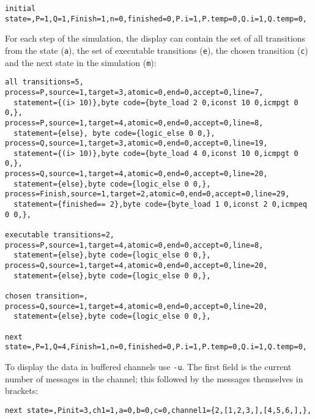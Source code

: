 \documentclass[11pt]{article}
\newcommand*{\p}[1]{\texttt{#1}}
\begin{document}
\begin{footnotesize}
\begin{verbatim}
initial state=,P=1,Q=1,Finish=1,n=0,finished=0,P.i=1,P.temp=0,Q.i=1,Q.temp=0,
\end{verbatim}
\end{footnotesize}

For each step of the simulation, the display can contain the set of all
transitions from the state (\p{a}), the set of executable transitions
(\p{e}), the chosen transition (\p{c}) and the next state in the
simulation (\p{m}):

\begin{footnotesize}
\begin{verbatim}
all transitions=5,
process=P,source=1,target=3,atomic=0,end=0,accept=0,line=7,
  statement={(i> 10)},byte code={byte_load 2 0,iconst 10 0,icmpgt 0 0,},
process=P,source=1,target=4,atomic=0,end=0,accept=0,line=8,
  statement={else}, byte code={logic_else 0 0,},
process=Q,source=1,target=3,atomic=0,end=0,accept=0,line=19,
  statement={(i> 10)},byte code={byte_load 4 0,iconst 10 0,icmpgt 0 0,},
process=Q,source=1,target=4,atomic=0,end=0,accept=0,line=20,
  statement={else},byte code={logic_else 0 0,},
process=Finish,source=1,target=2,atomic=0,end=0,accept=0,line=29,
  statement={finished== 2},byte code={byte_load 1 0,iconst 2 0,icmpeq 0 0,},

executable transitions=2,
process=P,source=1,target=4,atomic=0,end=0,accept=0,line=8,
  statement={else},byte code={logic_else 0 0,},
process=Q,source=1,target=4,atomic=0,end=0,accept=0,line=20,
  statement={else},byte code={logic_else 0 0,},

chosen transition=,
process=Q,source=1,target=4,atomic=0,end=0,accept=0,line=20,
  statement={else},byte code={logic_else 0 0,},

next state=,P=1,Q=4,Finish=1,n=0,finished=0,P.i=1,P.temp=0,Q.i=1,Q.temp=0,
\end{verbatim}
\end{footnotesize}

To display the data in buffered channels use \p{-u}.
The first field is the current number of messages in the channel;
this followed by the messages themselves in brackets:

\begin{footnotesize}
\begin{verbatim}
next state=,Pinit=3,ch1=1,a=0,b=0,c=0,channel1={2,[1,2,3,],[4,5,6,],},
\end{verbatim}
\end{footnotesize}
\end{document}

